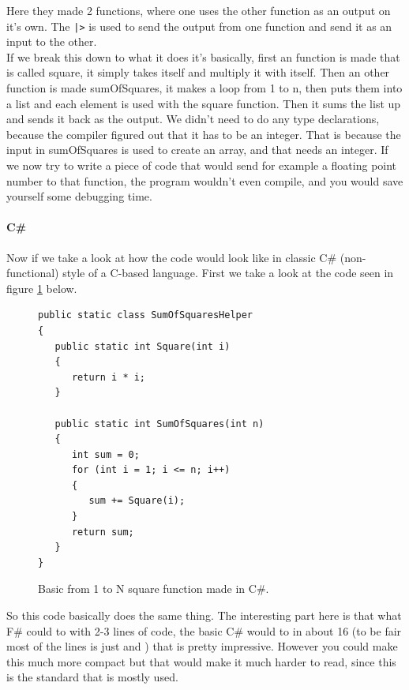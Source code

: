 \documentclass[12pt, a4paper]{article}
\newcommand{\code}[1]{{\small \texttt{#1}}}
\begin{document}
Here they made 2 functions, where one uses the other function as an output on it’s own. The \code{|>} is used to send the output from one function and send it as an input to the other.\\

If we break this down to what it does it’s basically, first an function is made that is called square, it simply takes itself and multiply it with itself. Then an other function is made sumOfSquares, it makes a loop from 1 to n, then puts them into a list and each element is used with the square function. Then it sums the list up and sends it back as the output. We didn’t need to do any type declarations, because the compiler figured out that it has to be an integer. That is because the input in sumOfSquares is used to create an array, and that needs an integer. If we now try to write a piece of code that would send for example a floating point number to that function, the program wouldn’t even compile, and you would save yourself some debugging time.\\

\newpage

\paragraph{C\#}
Now if we take a look at how the code would look like in classic C\# (non-functional) style of a C-based language. First we take a look at the code seen in figure \ref{fig:SquareFunctionCSharp} below.

\begin{figure}[!h]
\begin{lstlisting}
public static class SumOfSquaresHelper
{
   public static int Square(int i)
   {
      return i * i;
   }

   public static int SumOfSquares(int n)
   {
      int sum = 0;
      for (int i = 1; i <= n; i++)
      {
         sum += Square(i);
      }
      return sum;
   }
}
\end{lstlisting}
\caption{Basic from 1 to N square function made in C\#.}
\label{fig:SquareFunctionCSharp}
\end{figure}

So this code basically does the same thing. The interesting part here is that what F\# could to with 2-3 lines of code, the basic C\# would to in about 16 (to be fair most of the lines is just { and }) that is pretty impressive. However you could make this much more compact but that would make it much harder to read, since this is the standard that is mostly used.\\
\end{document}
